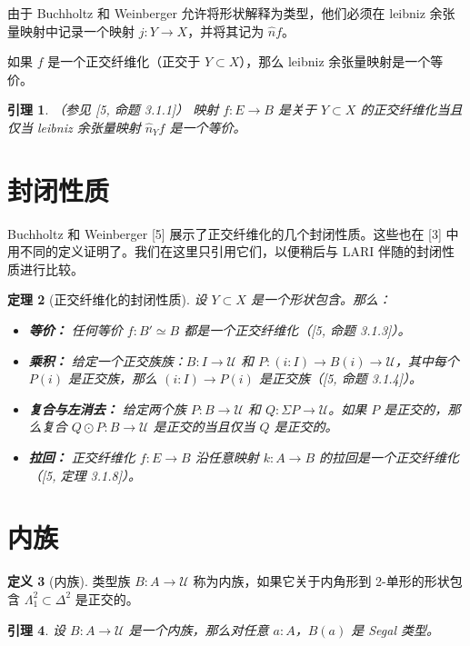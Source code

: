 \documentclass{ctexrep}
\theoremstyle{plain}
\newtheorem{theorem}{定理}[section]
\newtheorem{lemma}[theorem]{引理}
\theoremstyle{definition}
\newtheorem{definition}[theorem]{定义}
\theoremstyle{remark}
\theoremstyle{definition}
\theoremstyle{definition}
\theoremstyle{definition}
\newcommand{\UU}{\mathcal{U}}
\begin{document}
由于 Buchholtz 和 Weinberger 允许将形状解释为类型，他们必须在 leibniz 余张量映射中记录一个映射 $j:Y\to X$，并将其记为 $\widehat{n} f$。

如果 $f$ 是一个正交纤维化（正交于 $Y\subset X$），那么 leibniz 余张量映射是一个等价。

\begin{lemma}（参见 [5, 命题 3.1.1]）
映射 $f:E\to B$ 是关于 $Y\subset X$ 的正交纤维化当且仅当 leibniz 余张量映射 $\widehat{n}_Y f$ 是一个等价。
\end{lemma}

\section{封闭性质}

Buchholtz 和 Weinberger [5] 展示了正交纤维化的几个封闭性质。这些也在 [3] 中用不同的定义证明了。我们在这里只引用它们，以便稍后与 LARI 伴随的封闭性质进行比较。

\begin{theorem}[正交纤维化的封闭性质]
设 $Y\subset X$ 是一个形状包含。那么：
\begin{itemize}
\item \textbf{等价：} 任何等价 $f:B'\simeq B$ 都是一个正交纤维化（[5, 命题 3.1.3]）。
\item \textbf{乘积：} 给定一个正交族族：$B:I\to\UU$ 和 $P:(i:I)\to B(i)\to\UU$，其中每个 $P(i)$ 是正交族，那么 $(i:I)\to P(i)$ 是正交族（[5, 命题 3.1.4]）。
\item \textbf{复合与左消去：} 给定两个族 $P:B\to\UU$ 和 $Q:\Sigma P\to\UU$。如果 $P$ 是正交的，那么复合 $Q\odot P:B\to\UU$ 是正交的当且仅当 $Q$ 是正交的。
\item \textbf{拉回：} 正交纤维化 $f:E\to B$ 沿任意映射 $k:A\to B$ 的拉回是一个正交纤维化（[5, 定理 3.1.8]）。
\end{itemize}
\end{theorem}

\section{内族}

\begin{definition}[内族]
类型族 $B:A\to\UU$ 称为内族，如果它关于内角形到 2-单形的形状包含 $\Lambda_1^2 \subset \Delta^2$ 是正交的。
\end{definition}

\begin{lemma}
设 $B:A\to\UU$ 是一个内族，那么对任意 $a:A$，$B(a)$ 是 Segal 类型。
\end{lemma}
\end{document}
